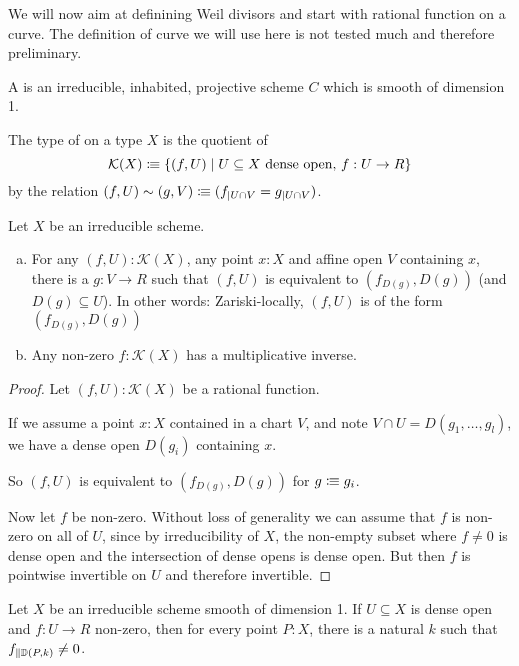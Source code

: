 We will now aim at definining Weil divisors and start with rational function on a curve.
The definition of curve we will use here is not tested much and therefore preliminary.

\begin{definition}
  A  is an irreducible, inhabited, projective scheme $C$ which is smooth of dimension 1.
\end{definition}

\begin{definition}
  The type of  on a type $X$ is the quotient of
  \[
  \mathcal K(X)\vcentcolon\mspace{-1.2mu}\equiv \{(f,U)\mid U\subseteq X\text{  dense open, } f:U\to R \}
  \]
  by the relation $(f,U) \sim (g,V) \vcentcolon\mspace{-1.2mu}\equiv (f_{\mid U\cap V}=g_{\mid U\cap V})$.
\end{definition}

\begin{lemma}
  Let $X$ be an irreducible scheme.
  \begin{enumerate}[(a)]
  \item For any $(f,U):\mathcal K(X)$, any point $x:X$ and affine open $V$ containing $x$,
    there is a $g:V\to R$ such that $(f,U)$ is equivalent to $(f_{D(g)},D(g))$ (and $D(g)\subseteq U$).
    In other words: Zariski-locally, $(f,U)$ is of the form $(f_{D(g)},D(g))$
  \item Any non-zero $f:\mathcal K(X)$ has a multiplicative inverse.
  \end{enumerate}
\end{lemma}

\begin{proof}
  Let  $(f,U):\mathcal K(X)$ be a rational function.

  If we assume a point $x:X$ contained in a chart $V$,
  and note $V\cap U = D(g_1,\dots,g_l)$,
  we have a dense open $D(g_i)$ containing $x$.

  So $(f,U)$ is equivalent to $(f_{D(g)},D(g))$ for $g\vcentcolon\mspace{-1.2mu}\equiv g_i$.

  Now let $f$ be non-zero.
  Without loss of generality we can assume that $f$ is non-zero on all of $U$,
  since by irreducibility of $X$, the non-empty subset where $f \neq 0$ is dense open
  and the intersection of dense opens is dense open.
  But then $f$ is pointwise invertible on $U$ and therefore invertible.
\end{proof}

\begin{lemma}
  Let $X$ be an irreducible scheme smooth of dimension 1.
  If $U\subseteq X$ is dense open and $f:U\to R$ non-zero,
  then for every point $P:X$, there is a natural $k$ such that $f_{\|\mathbb{D}(P,k)}\neq 0$.
\end{lemma}

